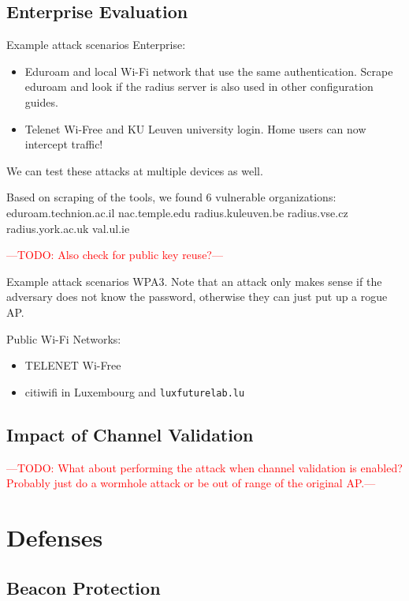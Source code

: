 \documentclass[sigconf,review]{acmart}
\newcommand{\wifi}{\mbox{Wi-Fi}}
\DeclareRobustCommand{\red}[1]{\textcolor{red}{#1}}
\begin{document}
\subsection{Enterprise Evaluation}

Example attack scenarios Enterprise:
\begin{itemize}
	\item Eduroam and local \wifi{} network that use the same authentication.
	Scrape eduroam and look if the radius server is also used in other configuration guides.
	\item Telenet Wi-Free and KU Leuven university login.
	Home users can now intercept traffic!
\end{itemize}

We can test these attacks at multiple devices as well.

Based on scraping of the tools, we found 6 vulnerable organizations:
eduroam.technion.ac.il
nac.temple.edu
radius.kuleuven.be
radius.vse.cz
radius.york.ac.uk
val.ul.ie

\red{---TODO: Also check for public key reuse?---}

Example attack scenarios WPA3.
Note that an attack only makes sense if the adversary does not know the password, otherwise they can just put up a rogue AP.

Public \wifi{} Networks:

\begin{itemize}
	\item TELENET Wi-Free
	\item citiwifi in Luxembourg and \verb|luxfuturelab.lu|
\end{itemize}


\subsection{Impact of Channel Validation}

\red{---TODO: What about performing the attack when channel validation is enabled? Probably just do a wormhole attack or be out of range of the original AP.---}

\section{Defenses}
\label{sec:defenses}

\subsection{Beacon Protection}
\end{document}
